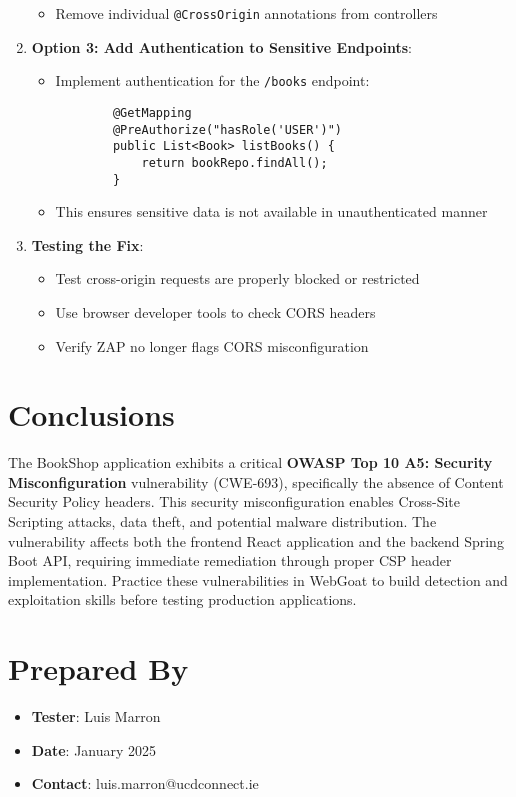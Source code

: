 \documentclass[]{UCD_CS_FYP_Report}
\begin{document}
\begin{enumerate}
\begin{itemize}
        \item Remove individual \texttt{@CrossOrigin} annotations from controllers
    \end{itemize}
    
    \item \textbf{Option 3: Add Authentication to Sensitive Endpoints}:
    \begin{itemize}
        \item Implement authentication for the \texttt{/books} endpoint:
        \begin{verbatim}
        @GetMapping
        @PreAuthorize("hasRole('USER')")
        public List<Book> listBooks() {
            return bookRepo.findAll();
        }
        \end{verbatim}
        
        \item This ensures sensitive data is not available in unauthenticated manner
    \end{itemize}
    
    \item \textbf{Testing the Fix}:
    \begin{itemize}
        \item Test cross-origin requests are properly blocked or restricted
        \item Use browser developer tools to check CORS headers
        \item Verify ZAP no longer flags CORS misconfiguration
    \end{itemize}
\end{enumerate}

\chapter{Conclusions}

The BookShop application exhibits a critical \textbf{OWASP Top 10 A5: Security Misconfiguration} vulnerability (CWE-693), specifically the absence of Content Security Policy headers. This security misconfiguration enables Cross-Site Scripting attacks, data theft, and potential malware distribution. The vulnerability affects both the frontend React application and the backend Spring Boot API, requiring immediate remediation through proper CSP header implementation. Practice these vulnerabilities in WebGoat to build detection and exploitation skills before testing production applications.



\chapter{Prepared By}
\begin{itemize}
    \item \textbf{Tester}: Luis Marron
    \item \textbf{Date}: January 2025
    \item \textbf{Contact}: luis.marron@ucdconnect.ie
\end{itemize}
\end{document}
